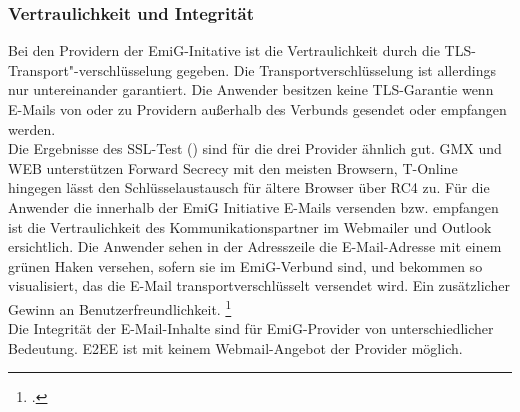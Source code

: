 \documentclass  [paper=a4,
				fontsize=12pt,
				listof=totoc,
				bibliography=totoc
				]{scrreprt}
\begin{document}
		\subsubsection{Vertraulichkeit und Integrität}		
			Bei den Providern der EmiG-Initative ist die Vertraulichkeit durch die TLS-Transport"-verschlüsselung gegeben. 
			Die Transportverschlüsselung ist allerdings nur untereinander garantiert. 
			Die Anwender besitzen keine \ac{TLS}-Garantie wenn E-Mails von oder zu Providern außerhalb des Verbunds gesendet oder empfangen werden.\\

			Die Ergebnisse des \ac{SSL}-Test () sind für die drei Provider ähnlich gut. GMX und WEB unterstützen Forward Secrecy mit den meisten Browsern, T-Online hingegen lässt den Schlüsselaustausch für ältere Browser über RC4 zu.
			Für die Anwender die innerhalb der EmiG Initiative E-Mails versenden bzw. empfangen ist die Vertraulichkeit des Kommunikationspartner im Webmailer und Outlook ersichtlich.
			Die Anwender sehen in der Adresszeile die E-Mail-Adresse mit einem grünen Haken versehen, sofern sie im \ac{EmiG}-Verbund sind, und bekommen so visualisiert, das die E-Mail transportverschlüsselt versendet wird. Ein zusätzlicher Gewinn an Benutzerfreundlichkeit.
			\footcite[Vgl.][]{Zivadino14-1}\medskip\\
			Die Integrität der E-Mail-Inhalte sind für \ac{EmiG}-Provider von unterschiedlicher Bedeutung.
			\acf{E2EE} ist mit keinem Webmail-Angebot der Provider möglich.
\end{document}
